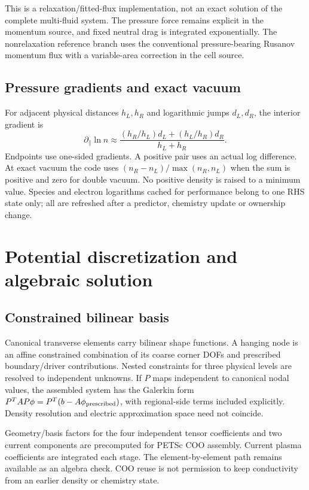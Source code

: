 This is a relaxation/fitted-flux implementation, not an exact solution of
the complete multi-fluid system. The pressure force remains explicit in
the momentum source, and fixed neutral drag is integrated exponentially.
The nonrelaxation reference branch uses the conventional pressure-bearing
Rusanov momentum flux with a variable-area correction in the cell source.

\subsection{Pressure gradients and exact vacuum}
For adjacent physical distances $h_L,h_R$ and logarithmic jumps $d_L,d_R$,
the interior gradient is
\begin{equation}
 \partial_\parallel\ln n\approx
 \frac{(h_R/h_L)d_L+(h_L/h_R)d_R}{h_L+h_R}.
\end{equation}
Endpoints use one-sided gradients. A positive pair uses an actual log
difference. At exact vacuum the code uses
$(n_R-n_L)/\max(n_R,n_L)$ when the sum is positive and zero for double vacuum.
No positive density is raised to a minimum value. Species and electron
logarithms cached for performance belong to one RHS state only; all are
refreshed after a predictor, chemistry update or ownership change.

\section{Potential discretization and algebraic solution}
\subsection{Constrained bilinear basis}
Canonical transverse elements carry bilinear shape functions. A hanging
node is an affine constrained combination of its coarse corner DOFs and
prescribed boundary/driver contributions. Nested constraints for three
physical levels are resolved to independent unknowns. If $P$ maps
independent to canonical nodal values, the assembled system has the
Galerkin form $P^TAP\phi=P^T(b-A\phi_{\rm prescribed})$, with regional-side
terms included explicitly. Density resolution and electric approximation
space need not coincide.

Geometry/basis factors for the four independent tensor coefficients and
two current components are precomputed for PETSc COO assembly. Current
plasma coefficients are integrated each stage. The element-by-element path
remains available as an algebra check. COO reuse is not permission to keep
conductivity from an earlier density or chemistry state.

